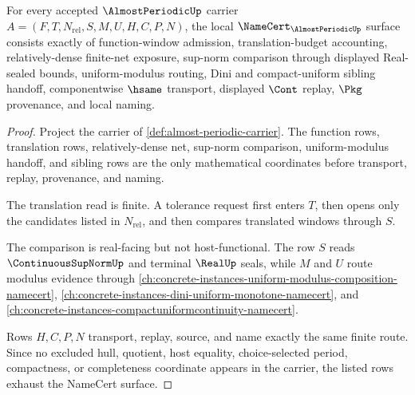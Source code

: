 \begin{theorem}
\label{thm:almost-periodic-namecert-obligations}
For every accepted $\AlmostPeriodicUp$ carrier $A=(F,T,N_{\mathrm{rel}},S,M,U,H,C,P,N)$, the local $\NameCert_{\AlmostPeriodicUp}$ surface consists exactly of function-window admission, translation-budget accounting, relatively-dense finite-net exposure, sup-norm comparison through displayed Real-sealed bounds, uniform-modulus routing, Dini and compact-uniform sibling handoff, componentwise $\hsame$ transport, displayed $\Cont$ replay, $\Pkg$ provenance, and local naming.
\end{theorem}
\begin{proof}
Project the carrier of \autoref{def:almost-periodic-carrier}. The function rows, translation rows, relatively-dense net, sup-norm comparison, uniform-modulus handoff, and sibling rows are the only mathematical coordinates before transport, replay, provenance, and naming.

The translation read is finite. A tolerance request first enters $T$, then opens only the candidates listed in $N_{\mathrm{rel}}$, and then compares translated windows through $S$.

The comparison is real-facing but not host-functional. The row $S$ reads $\ContinuousSupNormUp$ and terminal $\RealUp$ seals, while $M$ and $U$ route modulus evidence through \autoref{ch:concrete-instances-uniform-modulus-composition-namecert}, \autoref{ch:concrete-instances-dini-uniform-monotone-namecert}, and \autoref{ch:concrete-instances-compactuniformcontinuity-namecert}.

Rows $H,C,P,N$ transport, replay, source, and name exactly the same finite route. Since no excluded hull, quotient, host equality, choice-selected period, compactness, or completeness coordinate appears in the carrier, the listed rows exhaust the NameCert surface.
\end{proof}

